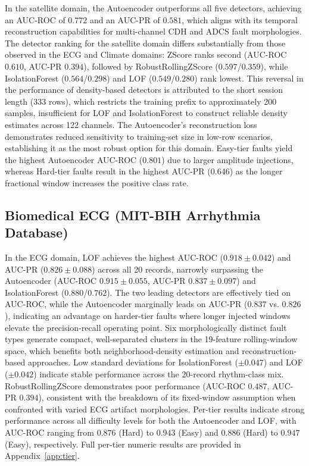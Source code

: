 \documentclass[conference]{IEEEtran}
\begin{document}
In the satellite domain, the Autoencoder outperforms all five detectors, achieving an AUC-ROC of $0.772$ and an AUC-PR of $0.581$, which aligns with its temporal reconstruction capabilities for multi-channel CDH and ADCS fault morphologies. The detector ranking for the satellite domain differs substantially from those observed in the ECG and Climate domains: ZScore ranks second (AUC-ROC $0.610$, AUC-PR $0.394$), followed by RobustRollingZScore ($0.597$/$0.359$), while IsolationForest ($0.564$/$0.298$) and LOF ($0.549$/$0.280$) rank lowest. This reversal in the performance of density-based detectors is attributed to the short session length (333 rows), which restricts the training prefix to approximately 200 samples, insufficient for LOF and IsolationForest to construct reliable density estimates across 122 channels. The Autoencoder's reconstruction loss demonstrates reduced sensitivity to training-set size in low-row scenarios, establishing it as the most robust option for this domain. Easy-tier faults yield the highest Autoencoder AUC-ROC ($0.801$) due to larger amplitude injections, whereas Hard-tier faults result in the highest AUC-PR ($0.646$) as the longer fractional window increases the positive class rate.

\subsection{Biomedical ECG (MIT-BIH Arrhythmia Database)}

In the ECG domain, LOF achieves the highest AUC-ROC ($0.918 \pm 0.042$) and AUC-PR ($0.826 \pm 0.088$) across all 20 records, narrowly surpassing the Autoencoder (AUC-ROC $0.915 \pm 0.055$, AUC-PR $0.837 \pm 0.097$) and IsolationForest ($0.880$/$0.762$). The two leading detectors are effectively tied on AUC-ROC, while the Autoencoder marginally leads on AUC-PR ($0.837$ vs. $0.826$), indicating an advantage on harder-tier faults where longer injected windows elevate the precision-recall operating point. Six morphologically distinct fault types generate compact, well-separated clusters in the 19-feature rolling-window space, which benefits both neighborhood-density estimation and reconstruction-based approaches. Low standard deviations for IsolationForest ($\pm 0.047$) and LOF ($\pm 0.042$) indicate stable performance across the 20-record rhythm-class mix. RobustRollingZScore demonstrates poor performance (AUC-ROC $0.487$, AUC-PR $0.394$), consistent with the breakdown of its fixed-window assumption when confronted with varied ECG artifact morphologies. Per-tier results indicate strong performance across all difficulty levels for both the Autoencoder and LOF, with AUC-ROC ranging from $0.876$ (Hard) to $0.943$ (Easy) and $0.886$ (Hard) to $0.947$ (Easy), respectively. Full per-tier numeric results are provided in Appendix~\ref{app:tier}.
\end{document}
